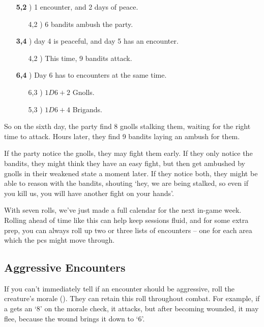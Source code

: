 \begin{multicols}{2}
\begin{itemize}
  \item[\textbf{5,2}]) 1 encounter, and 2 days of peace.
  \begin{itemize}
    \item[4,2]) 6 bandits ambush the party.
  \end{itemize}
  \item[\textbf{3,4}]) day 4 is peaceful, and day 5 has an encounter.
  \begin{itemize}
    \item[4,2]) This time, 9 bandits attack.
  \end{itemize}
  \item[\textbf{6,4}]) Day 6 has to encounters at the same time.
  \begin{itemize}
    \item[6,3]) $1D6+2$ Gnolls.
    \item[5,3]) $1D6+4$ Brigands.
  \end{itemize}
\end{itemize}

So on the sixth day, the party find 8 gnolls stalking them, waiting for the right time to attack.
Hours later, they find 9 bandits laying an ambush for them.

If the party notice the gnolls, they may fight them early.
If they only notice the bandits, they might think they have an easy fight, but then get ambushed by gnolls in their weakened state a moment later.
If they notice both, they might be able to reason with the bandits, shouting `hey, we are being stalked, so even if you kill us, you will have another fight on your hands'.

With seven rolls, we've just made a full calendar for the next in-game week.
Rolling ahead of time like this can help keep sessions fluid, and for some extra prep, you can always roll up two or three lists of encounters -- one for each area which the \glspl{pc} might move through.

\subsection{Aggressive Encounters}

If you can't immediately tell if an encounter should be aggressive, roll the creature's morale ().
They can retain this roll throughout combat.
For example, if a \iftoggle{aif}{Chitincrawler}{giant spider} gets an `8' on the morale check, it attacks, but after becoming wounded, it may flee, because the wound brings it down to `6'.


\end{multicols}
